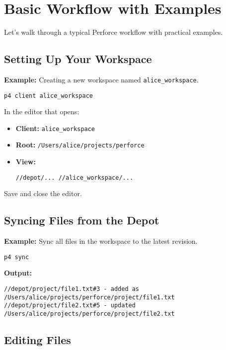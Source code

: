 \documentclass{article}
\begin{document}
\section{Basic Workflow with Examples}

Let's walk through a typical Perforce workflow with practical examples.

\subsection{Setting Up Your Workspace}

\textbf{Example:} Creating a new workspace named \texttt{alice\_workspace}.

\begin{lstlisting}[style=bash]
p4 client alice_workspace
\end{lstlisting}

In the editor that opens:

\begin{itemize}
    \item \textbf{Client:} \texttt{alice\_workspace}
    \item \textbf{Root:} \texttt{/Users/alice/projects/perforce}
    \item \textbf{View:}

\begin{verbatim}
//depot/... //alice_workspace/...
\end{verbatim}
\end{itemize}

Save and close the editor.

\subsection{Syncing Files from the Depot}

\textbf{Example:} Sync all files in the workspace to the latest revision.

\begin{lstlisting}[style=bash]
p4 sync
\end{lstlisting}

\textbf{Output:}

\begin{verbatim}
//depot/project/file1.txt#3 - added as /Users/alice/projects/perforce/project/file1.txt
//depot/project/file2.txt#5 - updated /Users/alice/projects/perforce/project/file2.txt
\end{verbatim}

\subsection{Editing Files}
\end{document}
